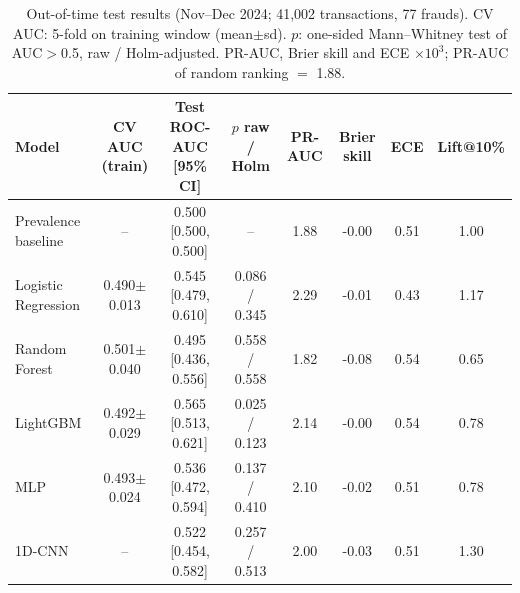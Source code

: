 \documentclass[conference]{IEEEtran}
\begin{document}
\begin{table}[t]
\centering
\caption{Out-of-time test results (Nov--Dec 2024; 41,002 transactions, 77 frauds). CV AUC: 5-fold on training window (mean$\pm$sd). $p$: one-sided Mann--Whitney test of AUC$>$0.5, raw / Holm-adjusted. PR-AUC, Brier skill and ECE $\times10^{3}$; PR-AUC of random ranking $=$ 1.88.}\label{tab:models}
\footnotesize
\begin{tabular}{@{}lccccccc@{}}
\toprule
Model & CV AUC (train) & Test ROC-AUC [95\% CI] & $p$ raw / Holm & PR-AUC & Brier skill & ECE & Lift@10\% \\
\midrule
Prevalence baseline & -- & 0.500 [0.500, 0.500] & -- & 1.88 & -0.00 & 0.51 & 1.00 \\
Logistic Regression & 0.490$\pm$0.013 & 0.545 [0.479, 0.610] & 0.086 / 0.345 & 2.29 & -0.01 & 0.43 & 1.17 \\
Random Forest & 0.501$\pm$0.040 & 0.495 [0.436, 0.556] & 0.558 / 0.558 & 1.82 & -0.08 & 0.54 & 0.65 \\
LightGBM & 0.492$\pm$0.029 & 0.565 [0.513, 0.621] & 0.025 / 0.123 & 2.14 & -0.00 & 0.54 & 0.78 \\
MLP & 0.493$\pm$0.024 & 0.536 [0.472, 0.594] & 0.137 / 0.410 & 2.10 & -0.02 & 0.51 & 0.78 \\
1D-CNN & -- & 0.522 [0.454, 0.582] & 0.257 / 0.513 & 2.00 & -0.03 & 0.51 & 1.30 \\
\bottomrule
\end{tabular}
\end{table}
\end{document}
